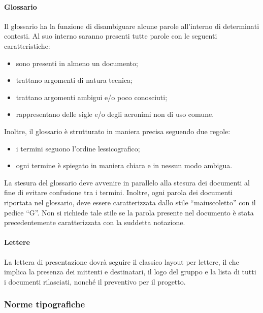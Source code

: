 			\paragraph{Glossario}
				Il glossario ha la funzione di disambiguare alcune parole all'interno di determinati contesti. Al suo interno saranno presenti tutte parole con le seguenti caratteristiche:
				\begin{itemize}
					\item sono presenti in almeno un documento;
					\item trattano argomenti di natura tecnica;
					\item trattano argomenti ambigui e/o poco conosciuti;
					\item rappresentano delle sigle e/o degli acronimi non di uso comune.
				\end{itemize}
				Inoltre, il glossario è strutturato in maniera precisa seguendo due regole:
				\begin{itemize}
					\item i termini seguono l'ordine lessicografico;
					\item ogni termine è spiegato in maniera chiara e in nessun modo ambigua.
				\end{itemize}
				La stesura del glossario deve avvenire in parallelo alla stesura dei documenti al fine di evitare confusione tra i termini. Inoltre, ogni parola dei documenti riportata nel glossario, deve essere caratterizzata dallo stile ``maiuscoletto'' con il pedice ``G''. Non si richiede tale stile se la parola presente nel documento è stata precedentemente caratterizzata con la suddetta notazione.
			\paragraph{Lettere}
				La lettera di presentazione dovrà seguire il classico layout per lettere, il che implica la presenza dei mittenti e destinatari, il logo del gruppo e la lista di tutti i documenti rilasciati, nonché il preventivo per il progetto.
		\subsubsection{Norme tipografiche}
